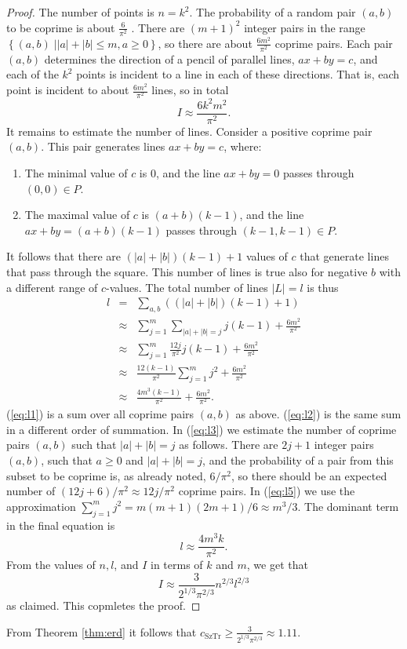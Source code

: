 \documentclass[11pt]{article}
\newcommand\sett[2]{\left\{ \left. #1 \;\right\vert #2 \right\}}
\newcommand\cst{c_{\mathrm{SzTr}}}
\begin{document}
%
\begin{proof}
The number of points is $n = k^2$.
The probability of a random pair $(a,b)$ to be coprime is about
$\frac{6}{\pi^2}$ \cite{Coprime}.
There are $(m+1)^2$ integer pairs in the range
$\sett{(a,b)}{|a|+|b| \le m, a \ge 0}$,
so there are about $\frac{6m^2}{\pi^2}$ coprime pairs.
Each pair $(a,b)$ determines the direction of a pencil of parallel lines,
$ax + by = c$, and each of the $k^2$ points is incident to a line in each of
these directions.
That is, each point is incident to about $\frac{6m^2}{\pi^2}$ lines, so in total
\[
I \approx \frac{6k^2m^2}{\pi^2}.
\]
It remains to estimate the number of lines.
Consider a positive coprime pair $(a,b)$. This pair generates lines
$ax + by = c$, where:
\begin{enumerate}
\item The minimal value of $c$ is $0$, and the line $ax + by = 0$ passes through
      $(0,0) \in P$.
\item The maximal value of $c$ is $(a+b)(k-1)$, and the line
      $ax + by = (a+b)(k-1)$ passes through $(k-1,k-1) \in P$.
\end{enumerate}
It follows that there are $(|a|+|b|)(k-1)+1$ values of $c$ that generate lines
that pass through the square.
This number of lines is true also for negative $b$ with a different range of
$c$-values.
The total number of lines $|L| = l$ is thus
\begin{eqnarray}
l & = & \sum_{a,b} ((|a|+|b|)(k-1)+1) \label{eq:l1} \\
	& \approx & \sum_{j=1}^m\sum_{|a|+|b|=j} j(k-1) + \frac{6m^2}{\pi^2} \label{eq:l2} \\
	& \approx & \sum_{j=1}^m \frac{12j}{\pi^2}j(k-1) + \frac{6m^2}{\pi^2} \label{eq:l3} \\
	& \approx & \frac{12(k-1)}{\pi^2}\sum_{j=1}^m j^2 + \frac{6m^2}{\pi^2} \label{eq:l4} \\
	& \approx & \frac{4m^3(k-1)}{\pi^2} + \frac{6m^2}{\pi^2}. \label{eq:l5}
\end{eqnarray}
(\ref{eq:l1}) is a sum over all coprime pairs $(a,b)$ as above.
(\ref{eq:l2}) is the same sum in a different order of summation.
In (\ref{eq:l3}) we estimate the number of coprime pairs $(a,b)$ such that
$|a|+|b|=j$ as follows. There are $2j+1$ integer pairs $(a,b)$, such that
$a \ge 0$ and $|a|+|b|=j$, and the probability of a pair from this subset
to be coprime is, as already noted, $6/\pi^2$, so there should be an
expected number of $(12j + 6)/\pi^2 \approx 12j/\pi^2$ coprime pairs.
In (\ref{eq:l5}) we use the approximation $\sum_{j=1}^m j^2 = m(m+1)(2m+1)/6
\approx m^3/3$.
The dominant term in the final equation is
\[
l \approx \frac{4m^3k}{\pi^2}.
\]
From the values of $n, l$, and $I$ in terms of $k$ and $m$, we get that
\[
I \approx \frac{3}{2^{1/3}\pi^{2/3}}n^{2/3}l^{2/3}
\]
as claimed. This copmletes the proof.
\end{proof}
%
From Theorem \ref{thm:erd} it follows that
$\cst \ge \frac{3}{2^{1/3}\pi^{2/3}} \approx 1.11$.
\end{document}
